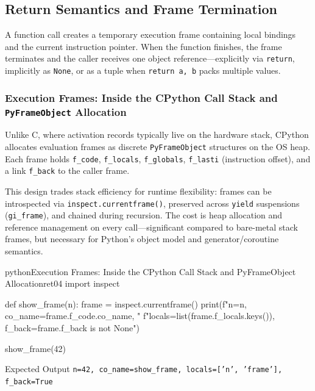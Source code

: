 \documentclass[a4paper,twoside]{report}
\begin{document}
\subsection{Return Semantics and Frame Termination}

A function call creates a temporary execution frame containing local bindings and the current instruction pointer. When the function finishes, the frame terminates and the caller receives one object reference---explicitly via \texttt{return}, implicitly as \texttt{None}, or as a tuple when \texttt{return a, b} packs multiple values.

\subsubsection{Execution Frames: Inside the CPython Call Stack and \texttt{PyFrameObject} Allocation}

Unlike C, where activation records typically live on the hardware stack, CPython allocates evaluation frames as discrete \texttt{PyFrameObject} structures on the OS heap. Each frame holds \texttt{f\_code}, \texttt{f\_locals}, \texttt{f\_globals}, \texttt{f\_lasti} (instruction offset), and a link \texttt{f\_back} to the caller frame.

This design trades stack efficiency for runtime flexibility: frames can be introspected via \texttt{inspect.currentframe()}, preserved across \texttt{yield} suspensions (\texttt{gi\_frame}), and chained during recursion. The cost is heap allocation and reference management on every call---significant compared to bare-metal stack frames, but necessary for Python's object model and generator/coroutine semantics.

\begin{codebox}[]{python}{Execution Frames: Inside the CPython Call Stack and PyFrameObject Allocation}{ret04}
import inspect

def show_frame(n):
    frame = inspect.currentframe()
    print(f"n={n}, co_name={frame.f_code.co_name}, "
          f"locals={list(frame.f_locals.keys())}, f_back={frame.f_back is not None}")

show_frame(42)
\end{codebox}


\begin{iobox}{Expected Output}
\texttt{n=42, co\_name=show\_frame, locals=['n', 'frame'], f\_back=True} \\
\end{iobox}
\end{document}
